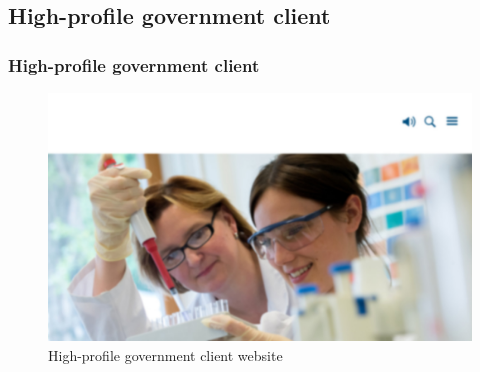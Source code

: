 \documentclass[aspectratio=169]{beamer}
\begin{document}
\subsection{High-profile government client}
\begin{frame}
  \frametitle{High-profile government client}
  \begin{figure}
    \includegraphics[height=.7\textheight]{./img/004_-_government_client.jpg}
    \caption{High-profile government client website}
  \end{figure}
\end{frame}
\end{document}
